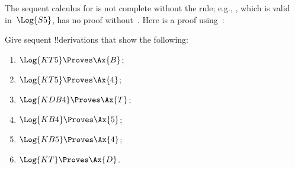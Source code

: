 \documentclass[../../../include/open-logic-section]{subfiles}
\begin{document}
\begin{ex}
The sequent calculus for  is not complete without the \Cut{}
rule; e.g., , which is valid in~$\Log{S5}$, has no proof
without~\Cut. Here is a proof using~\Cut:
\begin{prooftree}
\end{prooftree}
\end{ex}

\begin{prob}
Give sequent !!{derivation}s that show the following:
  \begin{enumerate}
  \item $\Log{KT5} \Proves \Ax{B}$;
  \item $\Log{KT5} \Proves \Ax{4}$;
  \item $\Log{KDB4} \Proves \Ax{T}$;
  \item $\Log{KB4} \Proves \Ax{5}$;
  \item $\Log{KB5} \Proves \Ax{4}$;
  \item $\Log{KT} \Proves \Ax{D}$.
  \end{enumerate}
\end{prob}
\end{document}
